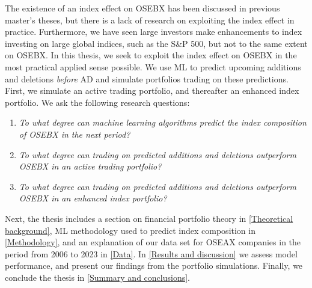 The existence of an index effect on OSEBX has been discussed in previous master's theses, but there is a lack of research on exploiting the index effect in practice. Furthermore, we have seen large investors make enhancements to index investing on large global indices, such as the S\&P 500, but not to the same extent on OSEBX. In this thesis, we seek to exploit the index effect on OSEBX in the most practical applied sense possible. We use ML to predict upcoming additions and deletions \textit{before} AD and simulate portfolios trading on these predictions. First, we simulate an active trading portfolio, and thereafter an enhanced index portfolio. We ask the following research questions:

\label{research-questions}
\begin{enumerate}
    \item \textit{To what degree can machine learning algorithms predict the index composition of OSEBX in the next period?}
    \item \textit{To what degree can trading on predicted additions and deletions outperform OSEBX in an active trading portfolio?}
    \item \textit{To what degree can trading on predicted additions and deletions outperform OSEBX in an enhanced index portfolio?}
\end{enumerate}

Next, the thesis includes a section on financial portfolio theory in \autoref{Theoretical background}, ML methodology used to predict index composition in \autoref{Methodology}, and an explanation of our data set for OSEAX companies in the period from 2006 to 2023 in \autoref{Data}. In \autoref{Results and discussion} we assess model performance, and present our findings from the portfolio simulations. Finally, we conclude the thesis in \autoref{Summary and conclusions}.    
